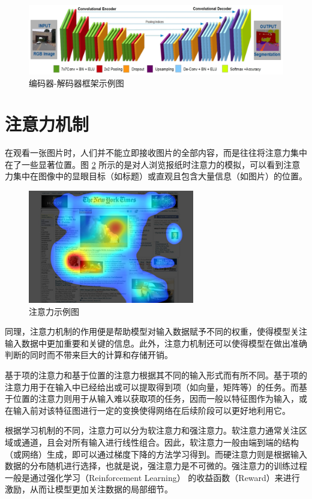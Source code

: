 \begin{figure}[!htbp]
	\centering
	\includegraphics[scale=0.98]{figures/10.png}
	\caption{编码器-解码器框架示例图}
	\label{fig:fig2-9}
\end{figure}

\section{注意力机制}

在观看一张图片时，人们并不能立即接收图片的全部内容，而是往往将注意力集中在了一些显著位置。图 \ref{fig:fig2-10} 所示的是对人浏览报纸时注意力的模拟，可以看到注意力集中在图像中的显眼目标（如标题）或直观且包含大量信息（如图片）的位置。

\begin{figure}[!htbp]
	\centering
	\includegraphics{figures/11.png}
	\caption{注意力示例图}
	\label{fig:fig2-10}
\end{figure}

同理，注意力机制的作用便是帮助模型对输入数据赋予不同的权重，使得模型关注输入数据中更加重要和关键的信息。此外，注意力机制还可以使得模型在做出准确判断的同时而不带来巨大的计算和存储开销。

基于项的注意力和基于位置的注意力根据其不同的输入形式而有所不同。基于项的注意力用于在输入中已经给出或可以提取得到项（如向量，矩阵等）的任务。而基于位置的注意力则用于从输入难以获取项的任务，因而一般以特征图作为输入，或在输入前对该特征图进行一定的变换使得网络在后续阶段可以更好地利用它。

根据学习机制的不同，注意力可以分为软注意力和强注意力。软注意力通常关注区域或通道，且会对所有输入进行线性组合。因此，软注意力一般由端到端的结构（或网络）生成，即可以通过梯度下降的方法学习得到。而硬注意力则是根据输入数据的分布随机进行选择，也就是说，强注意力是不可微的。强注意力的训练过程一般是通过强化学习（Reinforcement Learning） 的收益函数（Reward）来进行激励，从而让模型更加关注数据的局部细节。


